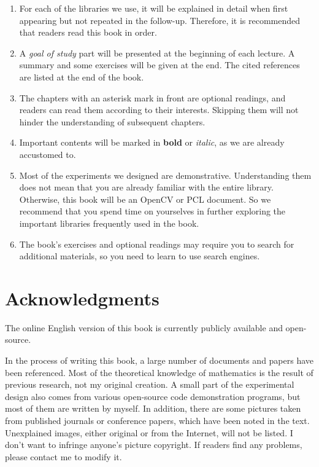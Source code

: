 \begin{enumerate}
	\item For each of the libraries we use, it will be explained in detail when first appearing but not repeated in the follow-up. Therefore, it is recommended that readers read this book in order.
	
	\item A \textit{goal of study} part will be presented at the beginning of each lecture. A summary and some exercises will be given at the end. The cited references are listed at the end of the book.

	\item The chapters with an asterisk mark in front are optional readings, and readers can read them according to their interests. Skipping them will not hinder the understanding of subsequent chapters.
	
	\item Important contents will be marked in \textbf{bold} or \emph{italic}, as we are already accustomed to.

	\item Most of the experiments we designed are demonstrative. Understanding them does not mean that you are already familiar with the entire library. Otherwise, this book will be an OpenCV or PCL document. So we recommend that you spend time on yourselves in further exploring the important libraries frequently used in the book.

	\item The book's exercises and optional readings may require you to search for additional materials, so you need to learn to use search engines.
\end{enumerate}

\section{Acknowledgments}
The online English version of this book is currently publicly available and open-source. %

In the process of writing this book, a large number of documents and papers have been referenced. Most of the theoretical knowledge of mathematics is the result of previous research, not my original creation. A small part of the experimental design also comes from various open-source code demonstration programs, but most of them are written by myself. In addition, there are some pictures taken from published journals or conference papers, which have been noted in the text. Unexplained images, either original or from the Internet, will not be listed. I don’t want to infringe anyone’s picture copyright. If readers find any problems, please contact me to modify it. 

